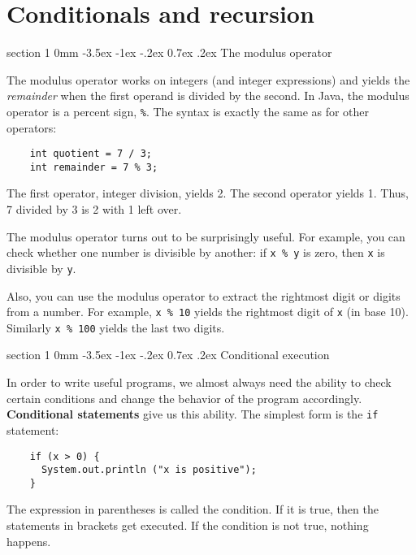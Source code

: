 \documentclass{book}
\makeatletter
\newcounter{exercisenum}
\renewcommand{\section}{\@startsection 
    {section} {1} {0mm}%
    {-3.5ex \@plus -1ex \@minus -.2ex}%
    {0.7ex \@plus.2ex}%
    {\normalfont\Large\bfseries}}
\newcommand{\clearemptydoublepage}{\newpage{\pagestyle{empty}\cleardoublepage}}
\newcommand{\beforechapter}{
    \cleardoublepage 
    \setcounter{exercisenum}{0}
}
\makeatother
\begin{document}
\beforechapter
\chapter{Conditionals and recursion}
\label{chap04}
\label{condrecursion}

\section{The modulus operator}

The modulus operator works on integers (and integer expressions)
and yields the {\em remainder} when the first operand is divided
by the second.  In Java, the modulus operator is a percent sign,
{\tt \%}.  The syntax is exactly the same as for other operators:

\begin{verbatim}
    int quotient = 7 / 3;
    int remainder = 7 % 3;
\end{verbatim}
%
The first operator, integer division, yields 2.  The second
operator yields 1.  Thus, 7 divided by 3 is 2 with 1 left over.

The modulus operator turns out to be surprisingly useful.  For
example, you can check whether one number is divisible by
another: if {\tt x \% y} is zero, then {\tt x} is divisible
by {\tt y}.

Also, you can use the modulus operator to extract the rightmost
digit or digits from a number.  For example, {\tt x \% 10} yields
the rightmost digit of {\tt x} (in base 10).  Similarly
{\tt x \% 100} yields the last two digits.


\section{Conditional execution}

In order to write useful programs, we almost always need the ability
to check certain conditions and change the behavior of the program
accordingly.  {\bf Conditional statements} give us this ability.  The
simplest form is the {\tt if} statement:

\begin{verbatim}
    if (x > 0) {
      System.out.println ("x is positive");
    }
\end{verbatim}
%
The expression in parentheses is called the condition.
If it is true, then the statements in brackets get executed.
If the condition is not true, nothing happens.
\end{document}
